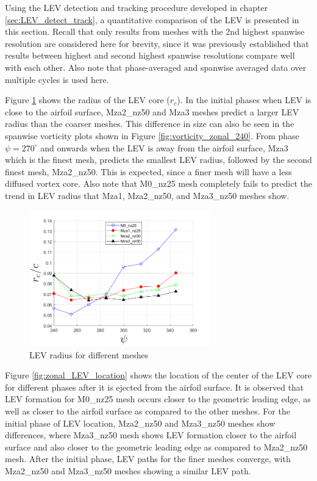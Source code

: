 Using the LEV detection and tracking procedure developed in chapter \ref{sec:LEV_detect_track}, a quantitative comparison of the LEV is presented in this section. 
Recall that only results from meshes with the 2nd highest spanwise resolution are considered here for brevity, since it was previously established that results between highest and second highest spanwise resolutions compare well with each other. 
Also note that phase-averaged and spanwise averaged data over multiple cycles is used here.

Figure \ref{fig:zonal_LEV_radius} shows the radius of the LEV core ($r_c$).
In the initial phases when LEV is close to the airfoil surface, Mza2\_nz50 and Mza3 meshes predict a larger LEV radius than the coarser meshes. 
This difference in size can also be seen in the spanwise vorticity plots shown in Figure \ref{fig:vorticity_zonal_240}.
From phase $\psi = 270^\circ$ and onwards when the LEV is away from the airfoil surface, Mza3 which is the finest mesh, predicts the smallest LEV radius, followed by the second finest mesh, Mza2\_nz50. 
This is expected, since a finer mesh will have a less diffused vortex core. Also note that M0\_nz25 mesh completely fails to predict the trend in LEV radius that Mza1, Mza2\_nz50, and Mza3\_nz50 meshes show.

\begin{figure}[H]
	\centering
	\includegraphics[width=0.7\textwidth]{figures/zonal_adapt_results/LEV/LEV_radius_vp}
	\caption{ LEV radius for different meshes}
	\label{fig:zonal_LEV_radius}
\end{figure}

Figure \ref{fig:zonal_LEV_location} shows the location of the center of the LEV core for different phases after it is ejected from the airfoil surface. 
It is observed that LEV formation for M0\_nz25 mesh occurs closer to the geometric leading edge, as well as closer to the airfoil surface as compared to the other meshes.
For the initial phase of LEV location, Mza2\_nz50 and Mza3\_nz50 meshes show differences, where Mza3\_nz50 mesh shows LEV formation closer to the airfoil surface and also closer to the geometric leading edge as compared to Mza2\_nz50 mesh.
After the initial phase, LEV paths for the finer meshes converge, with Mza2\_nz50 and Mza3\_nz50 meshes showing a similar LEV path.


